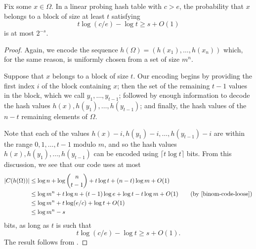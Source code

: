 \begin{lem}
  Fix some $x \in \Omega$. In a linear probing hash table with
  $c > e$, the probability that $x$ belongs to a block of size at
  least $t$ satisfying
  \[
  t \log (c/e) - \log t \geq s + O(1)
  \]
  is at most $2^{-s}$.
\end{lem}
\begin{proof}
  Again, we encode the sequence $h(\Omega) = (h(x_1), \ldots, h(x_n))$
  which, for the same reason, is uniformly chosen from a set of size
  $m^n$.

  Suppose that $x$ belongs to a block of size $t$. Our encoding begins
  by providing the first index $i$ of the block containing $x$; then
  the set of the remaining $t - 1$ values in the block, which we call
  $y_1, \ldots, y_{t - 1}$; followed by enough information to decode
  the hash values $h(x), h(y_1), \ldots, h(y_{t-1})$; and finally, the
  hash values of the $n - t$ remaining elements of $\Omega$.

  Note that each of the values $h(x) - i, h(y_1) - i, \ldots,
  h(y_{t-1}) - i$ are within the range $0, 1, \ldots, t - 1$ modulo
  $m$, and so the hash values $h(x), h(y_1), \ldots, h(y_{t-1})$ can
  be encoded using $\lceil t \log t \rceil$ bits. From this
  discussion, we see that our code uses at most
  \begin{align*}
    |C(h(\Omega))| &\leq \log n + \log \binom{n}{t - 1} + t \log t + (n - t) \log m + O(1) \\
                   &\leq \log m^n + t\log n + (t - 1)\log e + \log t - t \log m + O(1) \tag{by \eqref{binom-code-loose}}\\
                   &\leq \log m^n + t\log (e/c) + \log t + O(1) \\
                   &\leq \log m^n - s
  \end{align*}
  bits, as long as $t$ is such that
  \[
  t \log (c/e) - \log t \geq s + O(1).
  \]
  The result follows from .
\end{proof}



